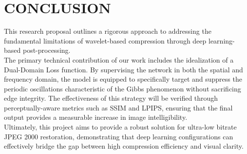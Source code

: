 \documentclass[12pt]{article}
\begin{document}
\section*{\large{C}\small{ONCLUSION}}

\quad This research proposal outlines a rigorous approach to addressing the fundamental limitations of wavelet-based compression through deep learning-based post-processing. \\

The primary technical contribution of our work includes the idealization of a Dual-Domain Loss function. By supervising the network in both the spatial and frequency domain, the model is equipped to specifically target and suppress the periodic oscillations characteristic of the Gibbs phenomenon without sacrificing edge integrity. The effectiveness of this strategy will be verified through perceptually-aware metrics such as SSIM and LPIPS, ensuring that the final output provides a measurable increase in image intelligibility. \\

Ultimately, this project aims to provide a robust solution for ultra-low bitrate JPEG 2000 restoration, demonstrating that deep learning configurations can effectively bridge the gap between high compression efficiency and visual clarity.
\end{document}
